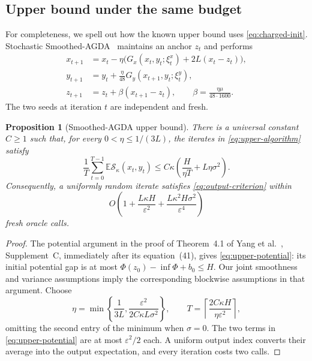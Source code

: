 \documentclass[11pt,a4paper]{article}
\newcommand{\E}{\mathbb E}
\newcommand{\eps}{\varepsilon}
\newcommand{\res}{\mathcal S_\kappa}
\newtheorem{proposition}[theorem]{Proposition}
\theoremstyle{definition}
\theoremstyle{remark}
\numberwithin{equation}{section}
\begin{document}
\subsection{Upper bound under the same budget}

For completeness, we spell out how the known upper bound uses
\eqref{eq:charged-init}. Stochastic Smoothed-AGDA~\cite{yang} maintains
an anchor $z_t$ and performs
\begin{equation}
 \begin{aligned}
 x_{t+1}&=x_t-\eta\bigl(G_x(x_t,y_t;\xi_t^x)+2L(x_t-z_t)\bigr),\\
 y_{t+1}&=y_t+\frac{\eta}{48}G_y(x_{t+1},y_t;\xi_t^y),\\
 z_{t+1}&=z_t+\beta(x_{t+1}-z_t),
 \qquad \beta=\frac{\eta\mu}{48\cdot1600}.
 \end{aligned}
 \label{eq:upper-algorithm}
\end{equation}
The two seeds at iteration $t$ are independent and fresh.

\begin{proposition}[Smoothed-AGDA upper bound]
\label{prop:upper-bound}
There is a universal constant $C\ge1$ such that, for every
$0<\eta\le1/(3L)$, the iterates in \eqref{eq:upper-algorithm} satisfy
\begin{equation}
 \frac1T\sum_{t=0}^{T-1}\E\res(x_t,y_t)
 \le C\kappa\left(\frac{H}{\eta T}+L\eta\sigma^2\right).
 \label{eq:upper-potential}
\end{equation}
Consequently, a uniformly random iterate satisfies
\eqref{eq:output-criterion} within
\[
 O\!\left(1+\frac{L\kappa H}{\eps^2}
              +\frac{L\kappa^2H\sigma^2}{\eps^4}\right)
\]
fresh oracle calls.
\end{proposition}

\begin{proof}
The potential argument in the proof of Theorem~4.1 of
Yang et al.~\cite{yang}, Supplement~C, immediately after its
equation~(41), gives
\eqref{eq:upper-potential}: its initial potential gap is at most
$\Phi(z_0)-\inf\Phi+b_0\le H$.
Our joint smoothness and variance assumptions imply the corresponding
blockwise assumptions in that argument. Choose
\[
 \eta=\min\left\{\frac1{3L},
       \frac{\eps^2}{2C\kappa L\sigma^2}\right\},\qquad
 T=\left\lceil\frac{2C\kappa H}{\eta\eps^2}\right\rceil,
\]
omitting the second entry of the minimum when $\sigma=0$.
The two terms in \eqref{eq:upper-potential} are at most
$\eps^2/2$ each. A uniform output index converts their average into
the output expectation, and every iteration costs two calls.
\end{proof}
\end{document}
